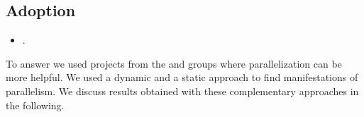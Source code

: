 





\subsection{Adoption}
\label{sec:rqC}
\label{sec:rqE}

\begin{itemize}
    \item \numRQAdoptionOne. \textbf{\RQAdoptionOne{}}
\end{itemize}

To answer \numRQAdoptionOne{} we used projects from the \medg{} and
\longg{} groups where parallelization can be more helpful. We used a
dynamic and a static approach to find manifestations of
parallelism. We discuss results obtained with these complementary
approaches in the following.

